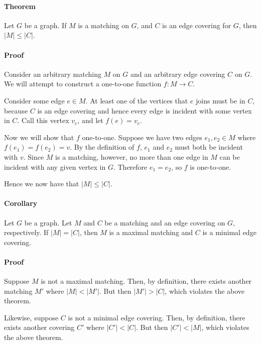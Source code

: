 \documentclass[12pt]{article}
\begin{document}
\paragraph{Theorem} Let $G$ be a graph.  If $M$ is a matching on $G$, and $C$ is an edge covering for $G$, then $|M| \leq |C|$.

\paragraph{Proof} Consider an arbitrary matching $M$ on $G$ and an arbitrary edge covering $C$ on $G$.  We will attempt to construct a one-to-one function $f: M \rightarrow C$.

Consider some edge $e \in M$.  At least one of the vertices that $e$ joins must be in $C$, because $C$ is an edge covering and hence every edge is incident with some vertex in $C$.  Call this vertex $v_e$, and let $f(e) = v_e$.

Now we will show that $f$ one-to-one.  Suppose we have two edges $e_1, e_2 \in M$ where $f(e_1) = f(e_2) = v$.  By the definition of $f$, $e_1$ and $e_2$ must both be incident with $v$.  Since $M$ is a matching, however, no more than one edge in $M$ can be incident with any given vertex in $G$.  Therefore $e_1 = e_2$, so $f$ is one-to-one.

Hence we now have that $|M| \leq |C|$.

\paragraph{Corollary} Let $G$ be a graph.  Let $M$ and $C$ be a matching and an edge covering on $G$, respectively.  If $|M| = |C|$, then $M$ is a maximal matching and $C$ is a minimal edge covering.

\paragraph{Proof} Suppose $M$ is not a maximal matching.  Then, by definition, there exists another matching $M'$ where $|M| < |M'|$.  But then $|M'| > |C|$, which violates the above theorem.

Likewise, suppose $C$ is not a minimal edge covering.  Then, by definition, there exists another covering $C'$ where $|C'| < |C|$.  But then $|C'| < |M|$, which violates the above theorem.
\end{document}
